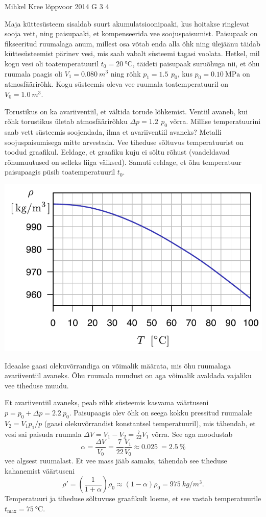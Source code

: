 {Mihkel Kree} %
{lõppvoor} %
{2014} %
{G 3} %
{4} %
{
\ifStatement
Maja küttesüsteem sisaldab suurt akumulatsioonipaaki, kus hoitakse ringlevat sooja vett, ning paisupaaki, et kompenseerida vee soojuspaisumist. Paisupaak on fikseeritud ruumalaga anum, millest osa võtab enda alla õhk ning ülejäänu täidab küttesüsteemist pärinev vesi, mis saab vabalt süsteemi tagasi voolata. Hetkel, mil kogu vesi oli toatemperatuuril $t_0=\SI{20}{\celsius}$, täideti paisupaak suruõhuga nii, et õhu ruumala paagis oli $V_1=\SI{0.080}{m^3}$ ning rõhk $p_1=\SI{1.5}{}\,p_0$, kus $p_0=\SI{0.10}{\mega\pascal}$ on atmosfäärirõhk. Kogu süsteemis oleva vee ruumala toatemperatuuril on $V_0=\SI{1.0}{m^3}$.

Torustikus on ka avariiventiil, et vältida torude lõhkemist. Ventiil avaneb, kui rõhk torustikus ületab atmosfäärirõhku $\Delta p = \SI{1.2}{} \, p_0 $ võrra. Millise temperatuurini saab vett süsteemis soojendada, ilma et avariiventiil avaneks? Metalli soojuspaisumisega mitte arvestada. Vee tiheduse sõltuvus temperatuurist on toodud graafikul. Eeldage, et graafiku kuju ei sõltu rõhust (vaadeldavad rõhumuutused on selleks liiga väiksed). Samuti eeldage, et õhu temperatuur paisupaagis püsib toatemperatuuril $t_0$.

\begin{center}
\includegraphics[width=0.8\linewidth]{2014-v3g-03-veeTihedus}
\end{center}
\fi


\ifHint
Ideaalse gaasi olekuvõrrandiga on võimalik määrata, mis õhu ruumalaga avariiventiil avaneks. Õhu ruumala muudust on aga võimalik avaldada vajaliku vee tiheduse muudu.
\fi


\ifSolution
Et avariiventiil avaneks, peab rõhk süsteemis kasvama väärtuseni $p=p_0+\Delta p = \SI{2.2}{}p_0$. Paisupaagis olev õhk on seega kokku pressitud ruumalale $V_2=V_1 p_1/p$ (gaasi olekuvõrrandist konstantsel temperatuuril), mis tähendab, et vesi sai paisuda ruumala $\Delta V = V_1-V_2 = \frac{7}{22}V_1$ võrra. See aga moodustab \[\alpha = \frac{\Delta V}{V_0}= \frac{7}{22}\frac{V_1}{V_0}\approx \SI{0.025}{} =  \SI{2.5}{}\%\] vee algsest ruumalast. Et vee mass jääb samaks, tähendab see tiheduse kahanemist väärtuseni \[\rho'=\left(\frac{1}{1+\alpha}\right)\rho_0\approx(1-\alpha)\rho_0= \SI{975}{kg/m^3}.\]
Temperatuuri ja tiheduse sõltuvuse graafikult loeme, et see vastab temperatuurile $t_\text{max}=\SI{75}{\celsius}$.
\fi


}
